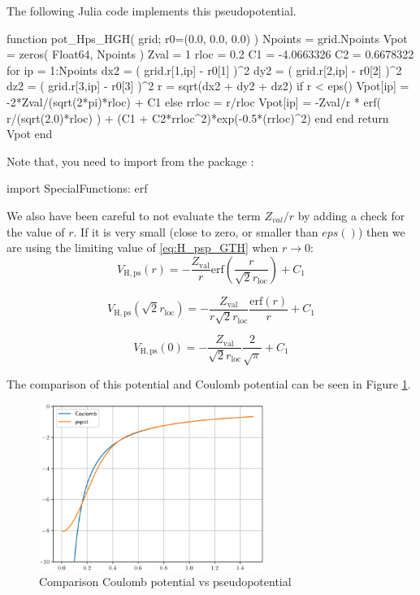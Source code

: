 The following Julia code implements this pseudopotential.
\begin{juliacode}
function pot_Hps_HGH( grid; r0=(0.0, 0.0, 0.0) )
  Npoints = grid.Npoints
  Vpot = zeros( Float64, Npoints )
  Zval = 1
  rloc = 0.2
  C1 = -4.0663326
  C2 = 0.6678322
  for ip = 1:Npoints
    dx2 = ( grid.r[1,ip] - r0[1] )^2
    dy2 = ( grid.r[2,ip] - r0[2] )^2
    dz2 = ( grid.r[3,ip] - r0[3] )^2
    r = sqrt(dx2 + dy2 + dz2)
    if r < eps()
      Vpot[ip] = -2*Zval/(sqrt(2*pi)*rloc) + C1
    else
      rrloc = r/rloc
      Vpot[ip] = -Zval/r * erf( r/(sqrt(2.0)*rloc) ) + (C1 + C2*rrloc^2)*exp(-0.5*(rrloc)^2)
    end
  end
  return Vpot
end
\end{juliacode}
Note that, you need to import  from the package :
\begin{juliacode}
import SpecialFunctions: erf
\end{juliacode}
We also have been careful to not evaluate the term $Z_{val}/r$ by adding a check for the value of $r$.
If it is very small (close to zero, or smaller than $eps()$) then we are using the limiting
value of \ref{eq:H_psp_GTH} when $r \rightarrow 0$:
\begin{equation}
V_{\mathrm{H,ps}}(r) = -\frac{Z_{\mathrm{val}}}{r}
  \mathrm{erf}\left( \frac{r}{\sqrt{2}r_{\mathrm{loc}}} \right) + C_{1}
\end{equation}

\begin{equation}
V_{\mathrm{H,ps}}(\sqrt{2}r_{\mathrm{loc}} ) = -\frac{Z_{\mathrm{val}}}{r \sqrt{2}r_{\mathrm{loc}}}
  \frac{\mathrm{erf}(r)}{r} + C_{1}
\end{equation}

\begin{equation}
V_{\mathrm{H,ps}}(0) = -\frac{Z_{\mathrm{val}}}{\sqrt{2}r_{\mathrm{loc}}}
  \frac{2}{\sqrt{\pi}} + C_{1}
\end{equation}

The comparison of this potential and Coulomb potential can be seen in
Figure \ref{fig:compare_H_pspot}.
\begin{figure}[h]
{\centering
\includegraphics[width=0.65\textwidth]{../codes/sch_3d/IMG_H_Coulomb_vs_pspot.pdf}
\par}
\caption{Comparison Coulomb potential vs pseudopotential}
\label{fig:compare_H_pspot}
\end{figure}

